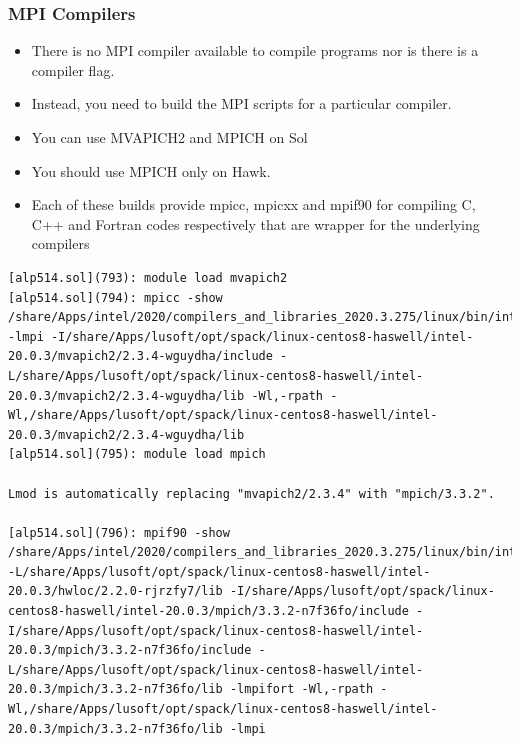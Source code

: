 \documentclass[10pt,t]{beamer}
\begin{document}
\begin{frame}[fragile]
  \frametitle{MPI Compilers}
  \begin{itemize}
    \item There is no MPI compiler available to compile programs nor is there is a compiler flag.
    \item Instead, you need to build the MPI scripts for a particular compiler.
    \item You can use MVAPICH2 and MPICH on Sol
    \item You should use MPICH only on Hawk. 
    \item Each of these builds provide mpicc, mpicxx and mpif90 for compiling C, C++ and Fortran codes respectively that are wrapper for the underlying compilers
  \end{itemize}
  \vspace{-0.25cm}
  \begin{block}{}
    \begin{lstlisting}[basicstyle=\tiny\ttfamily]
[alp514.sol](793): module load mvapich2
[alp514.sol](794): mpicc -show
/share/Apps/intel/2020/compilers_and_libraries_2020.3.275/linux/bin/intel64/icc -lmpi -I/share/Apps/lusoft/opt/spack/linux-centos8-haswell/intel-20.0.3/mvapich2/2.3.4-wguydha/include -L/share/Apps/lusoft/opt/spack/linux-centos8-haswell/intel-20.0.3/mvapich2/2.3.4-wguydha/lib -Wl,-rpath -Wl,/share/Apps/lusoft/opt/spack/linux-centos8-haswell/intel-20.0.3/mvapich2/2.3.4-wguydha/lib
[alp514.sol](795): module load mpich

Lmod is automatically replacing "mvapich2/2.3.4" with "mpich/3.3.2".

[alp514.sol](796): mpif90 -show
/share/Apps/intel/2020/compilers_and_libraries_2020.3.275/linux/bin/intel64/ifort -L/share/Apps/lusoft/opt/spack/linux-centos8-haswell/intel-20.0.3/hwloc/2.2.0-rjrzfy7/lib -I/share/Apps/lusoft/opt/spack/linux-centos8-haswell/intel-20.0.3/mpich/3.3.2-n7f36fo/include -I/share/Apps/lusoft/opt/spack/linux-centos8-haswell/intel-20.0.3/mpich/3.3.2-n7f36fo/include -L/share/Apps/lusoft/opt/spack/linux-centos8-haswell/intel-20.0.3/mpich/3.3.2-n7f36fo/lib -lmpifort -Wl,-rpath -Wl,/share/Apps/lusoft/opt/spack/linux-centos8-haswell/intel-20.0.3/mpich/3.3.2-n7f36fo/lib -lmpi
    \end{lstlisting}
  \end{block}
\end{frame}
\end{document}
